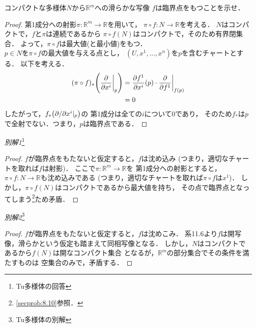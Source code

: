 \documentclass[dvipdfmx,a4paper,11pt]{jsarticle}
\begin{document}
\begin{enumerate}
  コンパクトな多様体$N$から$\mathbb{R}^m$への滑らかな写像
  $f$は臨界点をもつことを示せ．
  \begin{proof}
    第1成分への射影$\pi\colon\mathbb{R}^m\to\mathbb{R}$を用いて，
    $\pi\circ f\colon N\to\mathbb{R}$を考える．
    $N$はコンパクトで，$f$と$\pi$は連続であるから
    $\pi\circ f(N)$はコンパクトで，そのため有界閉集合．
    よって，$\pi\circ f$は最大値(と最小値)をもつ．\\
    $p\in N$を$\pi\circ f$の最大値を与える点とし，
    $(U,x^1,\dots,x^n)$を$p$を含むチャートとする．
    以下を考える．
    \begin{align}
      (\pi\circ f)_*\qty(\pdv{}{x^i}\bigg|_{p})
      &=\pdv{f^1}{x^i}\qty(p)\cdot \pdv{}{f^1}\bigg|_{f(p)}\\
      &=0
    \end{align}
    したがって，$f_*\qty(\partial/\partial x^i|_{p})$の
    第1成分は全ての$i$について0であり，
    そのため$f_*$は$p$で全射でない．つまり，$p$は臨界点である．
  \end{proof}
  \emph{別解1}\footnote{
    Tu多様体の回答
  }
  \begin{proof}
    $f$が臨界点をもたないと仮定すると，$f$は沈め込み
    (つまり，適切なチャートを取れば$f$は射影)．
    ここで$\pi\colon\mathbb{R}^m\to\mathbb{R}$を
    第1成分への射影とすると，
    $\pi\circ f\colon N\to\mathbb{R}$も沈め込みである
    (つまり，適切なチャートを取れば$\pi\circ f$は$x^1$)．
    しかし，$\pi\circ f(N)$はコンパクトであるから最大値を持ち，
    その点で臨界点となってしまう\footnote{
      \ref{secprob:8.10}参照．
    }ため矛盾．
  \end{proof}
  \emph{別解2}\footnote{
    Tu多様体の別解
  }
  \begin{proof}
    $f$が臨界点をもたないと仮定すると，$f$は沈めこみ．
    系11.6より$f$は開写像，滑らかという仮定も踏まえて同相写像となる．
    しかし，$N$はコンパクトであるから$f(N)$は開なコンパクト集合
    となるが，$\mathbb{R}^m$の部分集合でその条件を満たすものは
    空集合のみで，矛盾する．
  \end{proof}
\end{enumerate}
\end{document}
